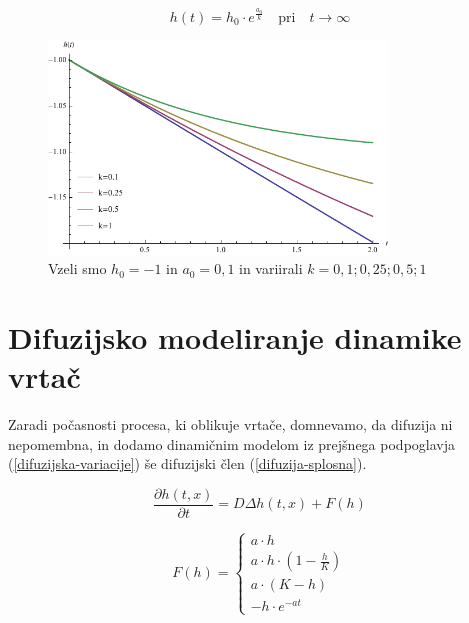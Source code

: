 \documentclass[a4paper, oneside, 12pt]{book}
\begin{document}
          \begin{equation}
            h(t) = h_0 \cdot e^{\frac{a_0}{k}} \quad \text{pri} \quad t \rightarrow \infty
            \label{dinamicna-gompertzova-limita}
          \end{equation}

            \begin{figure}[H]
              \begin{center}
                \includegraphics[width=9cm]{slike/gompertzova-rast}
              \end{center}
              \caption{Vzeli smo $h_0=-1$ in $a_0=0,1$ in variirali $k=0,1;0,25;0,5;1$}
              \label{fig:gompertzova-rast}
            \end{figure}

            \section{Difuzijsko modeliranje dinamike vrtač}

            Zaradi počasnosti procesa, ki oblikuje vrtače, domnevamo, da difuzija ni nepomembna, in dodamo dinamičnim modelom iz prejšnega podpoglavja  (\ref{difuzijska-variacije}) še difuzijski člen (\ref{difuzija-splosna}).

            \begin{equation}
              \frac{ \partial h(t,x) }{ \partial t} = D \Delta h(t,x) + F(h)
              \label{difuzija-splosna}
            \end{equation}

          \begin{equation}
            F(h) = \left \{ \begin{array}{lr} 
            a \cdot h \\
            a \cdot h \cdot (1 - \frac{h}{K}) \\
            a \cdot (K - h) \\
            - h \cdot e^{-a t}
            \end{array} \right. 
            \label{difuzijska-variacije}
          \end{equation}
\end{document}
